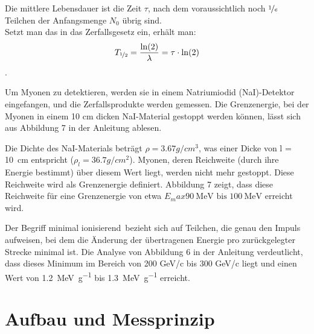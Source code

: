 \documentclass[12pt,a4paper,ngerman]{report}
\begin{document}
		Die mittlere Lebensdauer ist die Zeit $\tau$, nach dem voraussichtlich noch $\nicefrac{1}{e}$ Teilchen der Anfangsmenge $N_0$ übrig sind. \\
		Setzt man das in das Zerfallsgesetz ein, erhält man:
		\[T_{\nicefrac{1}{2}} = \frac{\ln(2)}{\lambda} = \tau \cdot \ln(2) \].
		
		Um Myonen zu detektieren, werden sie in einem Natriumiodid (NaI)-Detektor eingefangen, und die Zerfallsprodukte werden gemessen. Die Grenzenergie, bei der Myonen in einem 10 cm dicken NaI-Material gestoppt werden können, lässt sich aus Abbildung 7 in der Anleitung  \cite{Anleitung} ablesen.
		
		Die Dichte des NaI-Materials beträgt $\rho = 3.67 g/cm^3$, was einer Dicke von l = \qty{10}{\centi\meter} entspricht ($\rho_l = 36.7 g/cm^2$). Myonen, deren Reichweite (durch ihre Energie bestimmt) über diesem Wert liegt, werden nicht mehr gestoppt. Diese Reichweite wird als Grenzenergie definiert. Abbildung 7 zeigt, dass diese Reichweite für eine Grenzenergie von etwa $E_max  \qty{90}{\mega\electronvolt} \text{ bis } \qty{100}{\mega\electronvolt}$ erreicht wird.
		
		Der Begriff \glqq minimal ionisierend\grqq ~bezieht sich auf Teilchen, die genau den Impuls aufweisen, bei dem die Änderung der übertragenen Energie pro zurückgelegter Strecke minimal ist. Die Analyse von Abbildung 6 in der Anleitung verdeutlicht, dass dieses Minimum im Bereich von 200 GeV/c bis 300 GeV/c liegt und einen Wert von \qty{1.2}{\mega \electronvolt\per\gram} bis \qty{1.3}{\mega \electronvolt\per\gram} erreicht.
		

\chapter{Aufbau und Messprinzip}
\end{document}
